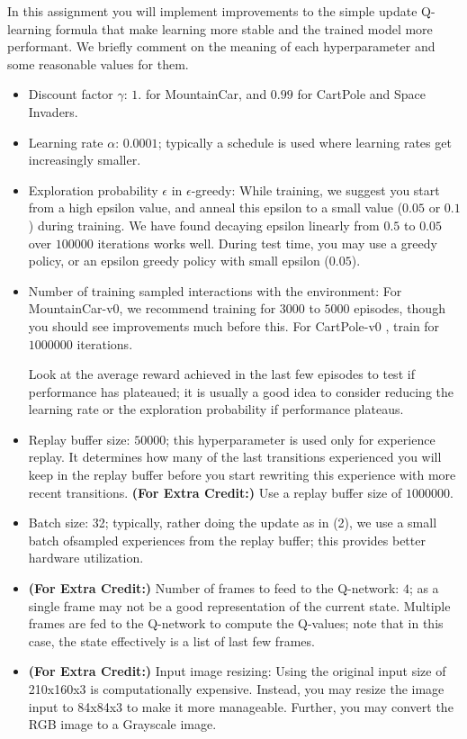\documentclass[12pt]{article}
\begin{document}
In this assignment you will implement improvements to the simple update Q-learning formula that make learning more stable and the trained model more performant. We briefly comment on the meaning of each hyperparameter and some reasonable values for them.
\begin{itemize}
	\item Discount factor $\gamma$: $1.$ for MountainCar, and $0.99$ for CartPole and Space Invaders. 
	\item Learning rate $\alpha$: $0.0001$; typically a schedule is used where learning rates get increasingly smaller. 
    \item Exploration probability $\epsilon$ in $\epsilon$-greedy: 
    While training, we suggest you start from a high epsilon value, and anneal this epsilon to a small value ($0.05$ or $0.1$) during training. 
    We have found decaying epsilon linearly from $0.5$ to $0.05$ over $100000$  iterations works well. 
    During test time, you may use a greedy policy, or an epsilon greedy policy with small epsilon ($0.05$).
    
	\item Number of training sampled interactions with the environment: 
	For MountainCar-v0, we recommend training for $3000$ to $5000$ episodes, though you should see improvements much before this. For CartPole-v0
	, train for $1000000$ iterations. 
	
	Look at the average reward achieved in the last few episodes  to test if performance has plateaued; it is usually a 
    good idea to consider reducing the learning rate or the exploration 
	probability if performance plateaus.
 	
 	\item Replay buffer size: $50000$; 
	this hyperparameter is used only for experience replay. It determines how many of the last transitions experienced you will keep in the replay buffer before you start rewriting this experience with more recent transitions. \textbf{(For Extra Credit:) } Use a replay buffer size of $1000000$.
	
	\item Batch size:  32;  typically, rather doing the update as in (2), we use a small batch ofsampled experiences from the replay buffer; this provides better hardware utilization.
	
 	\item \textbf{(For Extra Credit:) }Number of frames to feed to the Q-network: $4$; as a single frame may not be a good representation of the current state. 
    Multiple frames are fed to the Q-network to compute the Q-values; note that in this case, the state effectively is a list of last few frames.
    
    \item \textbf{(For Extra Credit:) } Input  image  resizing:  Using the original input size of 210x160x3 is computationally expensive. Instead, you may resize the image input to 84x84x3 to make it more manageable. Further, you may convert the RGB image to a Grayscale image.
    

\end{itemize}
\end{document}
